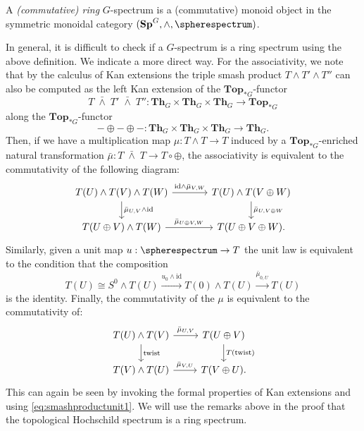 \begin{mydef}
A \textit{(commutative) ring} $G$-spectrum is a (commutative) monoid object in
the symmetric monoidal category $(\mathbf{Sp}^G, \wedge, \spherespectrum)$.
\end{mydef}
In general, it is difficult to check if a $G$-spectrum is a ring spectrum using the above
definition. We indicate a more direct way. For the associativity, we note that
by the calculus of Kan extensions the triple smash product $T\wedge T'\wedge T''$
can also be computed as the left Kan extension of the $\mathbf{Top}_{\ast G}$-functor
\[
T\;\bar{\wedge}\; T'\;\bar{\wedge}\; T'':\mathbf{Th}_G\times \mathbf{Th}_G\times \mathbf{Th}_G\to \mathbf{Top}_{\ast G}
\]
along the $\mathbf{Top}_{\ast G}$-functor
\[
-\oplus-\oplus-: \mathbf{Th}_G\times \mathbf{Th}_G\times \mathbf{Th}_G\to \mathbf{Th}_G.
\]
Then, if we have a multiplication map $\mu:T\wedge T\to T$ induced by a $\mathbf{Top}_{\ast G}$-enriched
natural transformation $\bar \mu:T\;\bar{\wedge}\; T\to T\circ \oplus$, the associativity
is equivalent to the commutativity of the following diagram:
\begin{equation}
\begin{tikzcd}[column sep = large]
T(U)\wedge T(V)\wedge T(W)
\arrow{d}{\bar \mu_{U,V}\wedge \mathrm{id}}\arrow{r}{\mathrm{id}\wedge \bar\mu_{V,W}}
&T(U)\wedge T(V\oplus W)
\arrow{d}{\bar\mu_{U,V\oplus W}}\\
T(U\oplus V)\wedge T(W)
\arrow{r}{\bar\mu_{U\oplus V,W}}
&T(U\oplus V\oplus W).
\end{tikzcd}
\end{equation}
Similarly, given a unit map $u: \spherespectrum\to T$ the unit law is equivalent to the condition that the composition
\begin{equation}\label{eq:ringspectrumunit}
T(U)\cong S^0\wedge T(U)\xrightarrow{u_0\wedge\mathrm{id}} T(0)\wedge T(U)\xrightarrow{\bar\mu_{0,U}} T(U)
\end{equation}
is the identity. Finally, the commutativity of the $\mu$ is equivalent to the commutativity of:
\begin{equation}
\begin{tikzcd}
T(U)\wedge T(V)
\arrow{d}{\mathrm{twist}}\arrow{r}{\bar\mu_{U,V}}
&T(U\oplus V)
\arrow{d}{T(\mathrm{twist})}\\
T(V)\wedge T(U)
\arrow{r}{\bar\mu_{V,U}}
&T(V\oplus U).
\end{tikzcd}
\end{equation}
This can again be seen by invoking the formal properties
of Kan extensions and using \eqref{eq:smashproductunit1}. 
We will use the remarks above in the proof that the 
topological Hochschild spectrum is a ring spectrum.

